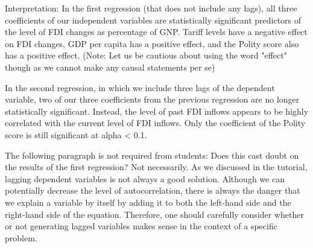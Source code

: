 \documentclass[12pt]{article}\usepackage[]{graphicx}\usepackage[]{color}
\begin{document}
Interpretation: In the first regression (that does not include any lags), all three coefficients of our independent variables are statistically significant predictors of the level of FDI changes as percentage of GNP. Tariff levels have a negative effect on FDI changes, GDP per capita has a positive effect, and the Polity score also has a positive effect. (Note: Let us be cautious about using the word "effect" though as we cannot make any causal statements per se)

In the second regression, in which we include three lags of the dependent variable, two of our three coefficients from the previous regression are no longer statistically significant. Instead, the level of past FDI inflows appears to be highly correlated with the current level of FDI inflows. Only the coefficient of the Polity score is still significant at alpha < 0.1.

The following paragraph is not required from students: Does this cast doubt on the results of the first regression? Not necessarily. As we discussed in the tutorial, lagging dependent variables is not always a good solution. Although we can potentially decrease the level of autocorrelation, there is always the danger that we explain a variable by itself by adding it to both the left-hand side and the right-hand side of the equation. Therefore, one should carefully consider whether or not generating lagged variables makes sense in the context of a specific problem.
\end{document}
